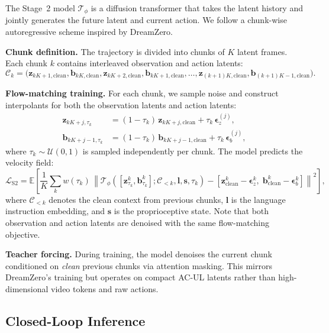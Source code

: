 \documentclass{article}
\newcommand{\vz}{\bm{z}}
\newcommand{\vb}{\bm{b}}
\newcommand{\vep}{\bm{\epsilon}}
\newcommand{\E}{\mathbb{E}}
\newcommand{\loss}{\mathcal{L}}
\begin{document}
The Stage~2 model $\mathcal{T}_\phi$ is a diffusion transformer that takes the latent history and jointly generates the future latent and current action. We follow a chunk-wise autoregressive scheme inspired by DreamZero.

\textbf{Chunk definition.}
The trajectory is divided into chunks of $K$ latent frames. Each chunk $k$ contains interleaved observation and action latents:
\begin{equation}
  \mathcal{C}_k = \big(\vz_{kK+1,\text{clean}}, \vb_{kK,\text{clean}}, \vz_{kK+2,\text{clean}}, \vb_{kK+1,\text{clean}}, \ldots, \vz_{(k+1)K,\text{clean}}, \vb_{(k+1)K-1,\text{clean}}\big).
  \label{eq:chunk}
\end{equation}

\textbf{Flow-matching training.}
For each chunk, we sample noise and construct interpolants for both the observation latents and action latents:
\begin{align}
  \vz_{kK+j,\tau_k} &= (1-\tau_k)\,\vz_{kK+j,\text{clean}} + \tau_k\,\vep_z^{(j)}, \label{eq:flow_latent} \\
  \vb_{kK+j-1,\tau_k} &= (1-\tau_k)\,\vb_{kK+j-1,\text{clean}} + \tau_k\,\vep_b^{(j)}, \label{eq:flow_action}
\end{align}
where $\tau_k \sim \mathcal{U}(0,1)$ is sampled independently per chunk. The model predicts the velocity field:
\begin{equation}
  \loss_{\text{S2}} = \E\!\left[\frac{1}{K}\sum_{k} w(\tau_k)\,\left\|
    \mathcal{T}_\phi\!\left([\vz_{\tau_k}^k, \vb_{\tau_k}^k]; \mathcal{C}_{<k}, \bm{l}, \bm{s}, \tau_k\right)
    - [\vz_{\text{clean}}^k - \vep_z^k,\; \vb_{\text{clean}}^k - \vep_b^k]
  \right\|^2\right],
  \label{eq:stage2_flow}
\end{equation}
where $\mathcal{C}_{<k}$ denotes the clean context from previous chunks, $\bm{l}$ is the language instruction embedding, and $\bm{s}$ is the proprioceptive state. Note that both observation and action latents are denoised with the same flow-matching objective.

\textbf{Teacher forcing.}
During training, the model denoises the current chunk conditioned on \emph{clean} previous chunks via attention masking. This mirrors DreamZero's training but operates on compact AC-UL latents rather than high-dimensional video tokens and raw actions.

\subsection{Closed-Loop Inference}
\label{sec:inference}
\end{document}
